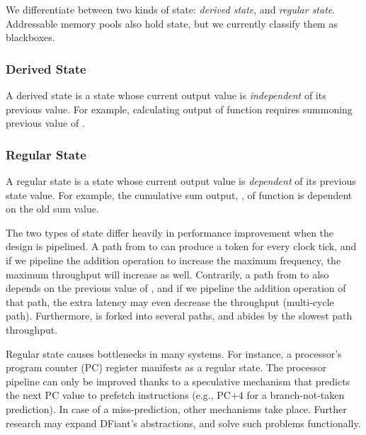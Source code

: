 
We differentiate between two kinds of state: \textit{derived state}, and \textit{regular state}. Addressable memory pools also hold state, but we currently classify them as blackboxes. %

\subsubsection{Derived State} 
A derived state is a state whose current output value is \textit{independent} of its previous value. For example, calculating output  of function  requires summoning previous value of . 

\subsubsection{Regular State} 
A regular state is a state whose current output value is \textit{dependent} of its previous state value. For example, the cumulative sum output, , of function  is dependent on the old sum value. 

The two types of state differ heavily in performance improvement when the design is pipelined. A path from  to  can produce a token for every clock tick, and if we pipeline the addition operation to increase the maximum frequency, the maximum throughput will increase as well. Contrarily, a path from  to  also depends on the previous value of , and if we pipeline the addition operation of that path, the extra latency may even decrease the throughput (multi-cycle path). Furthermore,  is forked into several paths, and  abides by the slowest path throughput. 

Regular state causes bottlenecks in many systems. For instance, a processor's program counter (PC) register manifests as a regular state. The processor pipeline can only be improved thanks to a speculative mechanism that predicts the next PC value to prefetch instructions (e.g., PC+4 for a branch-not-taken prediction). In case of a miss-prediction, other mechanisms take place. Further research may expand DFiant's abstractions, and solve such problems functionally.



